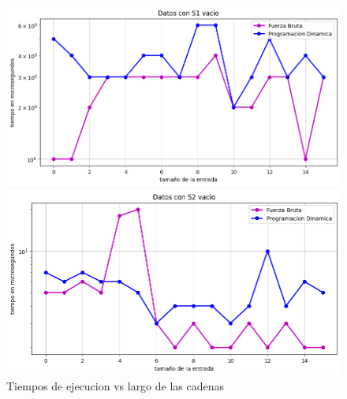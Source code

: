 \begin{figure}[H]
    \centering
    \begin{minipage}[t]{0.5\textwidth}
        \includegraphics[width=\textwidth]{images/s1vacio.png}
    \end{minipage}%
    \begin{minipage}[t]{0.5\textwidth}
        \includegraphics[width=\textwidth]{images/s2vacio.png}   \end{minipage}%
    \caption{Tiempos de ejecucion vs largo de las cadenas}
    \label{fig:Tiempos de ejecucion vs largo de las cadenas}
\end{figure}

